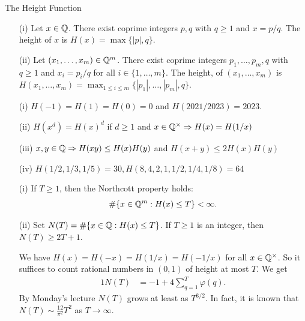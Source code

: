 \documentclass{beamer}
\begin{document}
\begin{frame}{The Height Function}
  \begin{definition}
    \begin{enumerate}
    \item [(i)]
      Let $x\in {\mathbb{Q}}$. There exist coprime integers $p,q$ with
      $q\ge 1$ and $x=p/q$. The \alert{height} of $x$ is $H(x)=\max\{|p|,q\}$.
    \item[(ii)] Let $(x_1,\ldots,x_m)\in{\mathbb{Q}}^m$. There exist coprime integers
      $p_1,\ldots,p_m,q$ with $q\ge 1$ and $x_i = p_i/q$ for all $i\in
      \{1,\ldots,m\}$.
      The  \alert{height},
      of $(x_1,\ldots,x_m)$ is $H(x_1,\ldots,x_m)
      = \max_{1\le i\le m} \{|p_1|,\ldots,|p_m|,q\}$.
    \end{enumerate}
  \end{definition}

  \begin{example}
  \begin{enumerate}
  \item [(i)] $H(-1)=H(1)=H(0)=0$ and $H(2021/2023) = 2023$.
  \item[(ii)] 
    $H(x^d)=H(x)^d$ if $d\ge 1$ and $x\in {\mathbb{Q}}^\times \Rightarrow H(x)=H(1/x)$ 

  \item[(iii)] $x,y\in{\mathbb{Q}}\Rightarrow H(xy)\le H(x)H(y)$ and $H(x+y)\le
    2H(x)H(y)$
  \item[(iv)] $H(1/2,1/3,1/5) = 30, H(8,4,2,1,1/2,1/4,1/8) = 64$
  \end{enumerate}  
  \end{example}
\end{frame}

\begin{frame}
  \begin{example}\label{ex:heightcount1}
    \begin{enumerate}
    \item [(i)] If $T\ge 1$, then the \alert{Northcott property} holds:  
      $$ \# \{ x\in {\mathbb{Q}}^m : H(x)\le T\} <\infty.$$

    \item[(ii)]
      Set $N(T) = \#\{x\in{\mathbb{Q}} : H(x)\le T\}$.
      If $T\ge 1$ is an integer, then $N(T) \ge 2T+1$.

      We have
      $H(x)=H(-x)=H(1/x)=H(-1/x)$ for all
      $x\in{\mathbb{Q}}^\times$. So it suffices to count rational numbers in
      $(0,1)$ of height at most $T$. We get
      \begin{alignat*}1
        N(T) 
        &= -1+4\sum_{q=1}^T \varphi(q).
      \end{alignat*}
      By Monday's lecture
      $N(T)$ grows at least as $T^{3/2}$. In fact, it is known that
      $N(T)\sim \frac{12}{\pi^2} T^2$ as $T\rightarrow\infty$.
    \end{enumerate}
  \end{example}
\end{frame}
\end{document}
